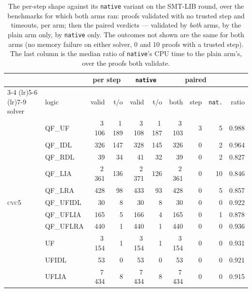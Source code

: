 \documentclass[runningheads]{llncs}
\newcommand{\cvcv}{\textsc{cvc5}\xspace}
\begin{document}
\begin{table}[p]
  \centering
  \caption{The per-step shape against its \texttt{native} variant on the
    SMT-LIB round, over the benchmarks for which both arms ran: proofs
    validated with no trusted step and timeouts, per arm; then the paired
    verdicts --- validated by \emph{both} arms, by the plain arm only, by
    \texttt{native} only. The outcomes not shown are the same for both arms
    (no memory failure on either solver, 0 and 10 proofs with a trusted step). The last column is the median ratio of \texttt{native}'s
    CPU time to the plain arm's, over the proofs both validate.}
  \label{tab:native}
  \small
  \setlength{\tabcolsep}{3.4pt}
  \begin{tabular}{l l r r @{\quad} r r @{\quad} r r r @{\quad} r}
    \toprule
    & & \multicolumn{2}{c}{per step} & \multicolumn{2}{c}{\texttt{native}}
      & \multicolumn{3}{c}{paired} & \\
    \cmidrule(lr){3-4} \cmidrule(lr){5-6} \cmidrule(lr){7-9}
    solver & logic & valid & t/o & valid & t/o & both & step & \texttt{nat.}
      & ratio \\
    \midrule
    \multirow{13}{*}{\cvcv}
      & QF\_UF    &   3\,106 &  1\,189 &   3\,108 &  1\,187 &   3\,103 &  3 &  5 & 0.988 \\
      & QF\_IDL   &      326 &     147 &      328 &     145 &      326 &  0 &  2 & 0.964 \\
      & QF\_RDL   &       39 &      34 &       41 &      32 &       39 &  0 &  2 & 0.827 \\
      & QF\_LIA   &   2\,361 &     136 &   2\,371 &     126 &   2\,361 &  0 & 10 & 0.846 \\
      & QF\_LRA   &      428 &      98 &      433 &      93 &      428 &  0 &  5 & 0.857 \\
      & QF\_UFIDL &       30 &       8 &       30 &       8 &       30 &  0 &  0 & 0.922 \\
      & QF\_UFLIA &      165 &       5 &      166 &       4 &      165 &  0 &  1 & 0.878 \\
      & QF\_UFLRA &      440 &       1 &      440 &       1 &      440 &  0 &  0 & 0.936 \\
      & UF        &   3\,154 &       1 &   3\,154 &       1 &   3\,154 &  0 &  0 & 0.931 \\
      & UFIDL     &       53 &       0 &       53 &       0 &       53 &  0 &  0 & 0.921 \\
      & UFLIA     &   7\,434 &       8 &   7\,434 &       8 &   7\,434 &  0 &  0 & 0.915 \\

\end{tabular}
\end{table}
\end{document}
